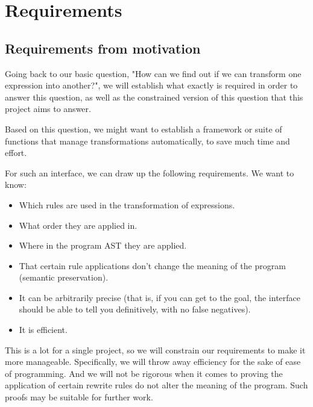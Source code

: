 \documentclass{l4proj}
\begin{document}
\chapter{Requirements} \label{requirements}

\section{Requirements from motivation}
Going back to our basic question, "How can we find out if we can transform one expression into another?", we will establish what exactly is required in order to answer this question, as well as the constrained version of this question that this project aims to answer.
 
Based on this question, we might want to establish a framework or suite of functions that manage transformations automatically, to save much time and effort.
 
For such an interface, we can draw up the following requirements. We want to know:
\begin{itemize}
    \item Which rules are used in the transformation of expressions.
    \item What order they are applied in.
    \item Where in the program AST they are applied.
    \item That certain rule applications don't change the meaning of the program (semantic preservation).
    \item It can be arbitrarily precise (that is, if you can get to the goal, the interface should be able to tell you definitively, with no false negatives).
    \item It is efficient.
\end{itemize}
 
This is a lot for a single project, so we will constrain our requirements to make it more manageable.
Specifically, we will throw away efficiency for the sake of ease of programming. 
And we will not be rigorous when it comes to proving the application of certain rewrite rules do not alter the meaning of the program. Such proofs may be suitable for further work.
\end{document}
